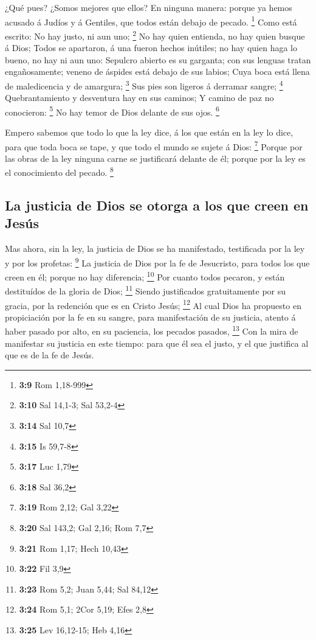  ¿Qué pues? ¿Somos mejores que ellos? En ninguna manera:
porque ya hemos acusado á Judíos y á Gentiles, que todos están debajo de
pecado. \footnote{\textbf{3:9} Rom 1,18-999}  Como está
escrito: No hay justo, ni aun uno; \footnote{\textbf{3:10} Sal 14,1-3;
  Sal 53,2-4}  No hay quien entienda, no hay quien busque á
Dios;  Todos se apartaron, á una fueron hechos inútiles; no
hay quien haga lo bueno, no hay ni aun uno:  Sepulcro
abierto es su garganta; con sus lenguas tratan engañosamente; veneno de
áspides está debajo de sus labios;  Cuya boca está llena de
maledicencia y de amargura; \footnote{\textbf{3:14} Sal 10,7}
 Sus pies son ligeros á derramar sangre; \footnote{\textbf{3:15}
  Is 59,7-8}  Quebrantamiento y desventura hay en sus
caminos;  Y camino de paz no conocieron: \footnote{\textbf{3:17}
  Luc 1,79}  No hay temor de Dios delante de sus ojos.
\footnote{\textbf{3:18} Sal 36,2}

 Empero sabemos que todo lo que la ley dice, á los que
están en la ley lo dice, para que toda boca se tape, y que todo el mundo
se sujete á Dios: \footnote{\textbf{3:19} Rom 2,12; Gal 3,22}
 Porque por las obras de la ley ninguna carne se
justificará delante de él; porque por la ley es el conocimiento del
pecado. \footnote{\textbf{3:20} Sal 143,2; Gal 2,16; Rom 7,7}

\hypertarget{la-justicia-de-dios-se-otorga-a-los-que-creen-en-jesuxfas}{%
\subsection{La justicia de Dios se otorga a los que creen en
Jesús}\label{la-justicia-de-dios-se-otorga-a-los-que-creen-en-jesuxfas}}

 Mas ahora, sin la ley, la justicia de Dios se ha
manifestado, testificada por la ley y por los profetas: \footnote{\textbf{3:21}
  Rom 1,17; Hech 10,43}  La justicia de Dios por la fe de
Jesucristo, para todos los que creen en él; porque no hay diferencia;
\footnote{\textbf{3:22} Fil 3,9}  Por cuanto todos pecaron,
y están destituídos de la gloria de Dios; \footnote{\textbf{3:23} Rom
  5,2; Juan 5,44; Sal 84,12}  Siendo justificados
gratuitamente por su gracia, por la redención que es en Cristo Jesús;
\footnote{\textbf{3:24} Rom 5,1; 2Cor 5,19; Efes 2,8}  Al
cual Dios ha propuesto en propiciación por la fe en su sangre, para
manifestación de su justicia, atento á haber pasado por alto, en su
paciencia, los pecados pasados, \footnote{\textbf{3:25} Lev 16,12-15;
  Heb 4,16}  Con la mira de manifestar su justicia en este
tiempo: para que él sea el justo, y el que justifica al que es de la fe
de Jesús.

